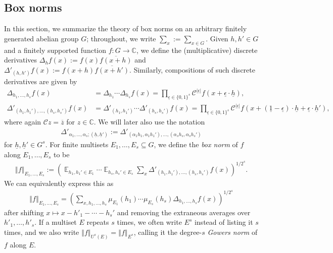 \documentclass[11pt]{amsart}
\theoremstyle{definition}
\DeclareMathOperator*{\E}{\mathbb{E}}
\newcommand{\C}{{\mathbb C}}
\newcommand{\CC}{{\mathcal C}}
\newcommand{\uh}{{\underline{h}}}
\newcommand{\ueps}{{\underline{\epsilon}}}
\newcommand{\norm}[1]{\left\Vert #1\right\Vert}
\newcommand{\brac}[1]{\mathopen{}\left( #1 \mathclose{}\right)}
\begin{document}
\subsection{Box norms}
In this section, we summarize
the theory of box norms on an arbitrary finitely generated abelian group $G$; throughout, we write $\sum_x:=\sum_{x\in G}$. Given $h, h'\in G$ and a finitely supported function $f: G\to\C$, we define
the (multiplicative) discrete derivatives
$\Delta_h f(x) := f(x)\overline{f(x+h)}$ and $\Delta'_{(h,h')} f(x) := f(x+h)\overline{f(x+h')}$.  Similarly, compositions of such discrete derivatives are given by
\begin{align*}
    \Delta_{h_1, \ldots, h_s}f(x) &= \Delta_{h_1}\cdots \Delta_{h_s}f(x) = \prod_{\ueps\in\{0,1\}^s}\CC^{|\ueps|}f(x+\ueps\cdot \uh),\\
    \Delta'_{(h_1, h_1'), \ldots, (h_s,h_s')}f(x) &= \Delta'_{(h_1, h_1')}\cdots\Delta'_{(h_s, h_s')}f(x) = \prod_{\ueps\in\{0,1\}^s}\CC^{|\ueps|}f(x+(\underline{1}-\ueps)\cdot\uh + \ueps\cdot\uh'),
\end{align*}
where again $\CC z = \overline{z}$ for $z\in\C$.
We will later also use the notation
\begin{align*}
    \Delta'_{\alpha_1,\ldots, \alpha_s; (\uh, \uh')} := \Delta'_{(\alpha_1 h_1, \alpha_1 h_1'), \ldots, (\alpha_s h_s, \alpha_s h_s')}
\end{align*}
{for $\uh, \uh' \in G^s$.}
For finite multisets $E_1, \ldots, E_s\subseteq G$, we define the \textit{box norm} of $f$ {along}  $E_1, \ldots, E_s$ to be
\begin{align*}
    \norm{f}_{E_1, \ldots, E_s}:=\brac{\E_{h_1, h_1'\in E_1}\cdots\E_{h_s, h_s'\in E_s}\sum_x \Delta'_{(h_1, h_1'), \ldots, (h_s,h_s')}f(x)}^{1/2^s}.
\end{align*}
We can equivalently express this as
\begin{align}\label{E: box norms with Fejer kernels}
    \norm{f}_{E_1, \ldots, E_s} = \brac{\sum_{x, h_1, \ldots, h_s} \mu_{E_1}(h_1)\cdots \mu_{E_s}(h_s) \Delta_{h_1, \ldots, h_s}f(x)}^{1/2^s}
\end{align}
after shifting $x\mapsto x-h'_1-\cdots - h_s'$ and removing the extraneous averages over $h'_1, \ldots, h'_s$. If a multiset $E$ repeats $s$ times, we often write $E^s$ instead of listing it $s$ times, and we also write $\norm{f}_{U^s(E)} = \norm{f}_{E^s}$, calling it the degree-$s$ \textit{Gowers norm} of $f$ along $E$.
\end{document}
